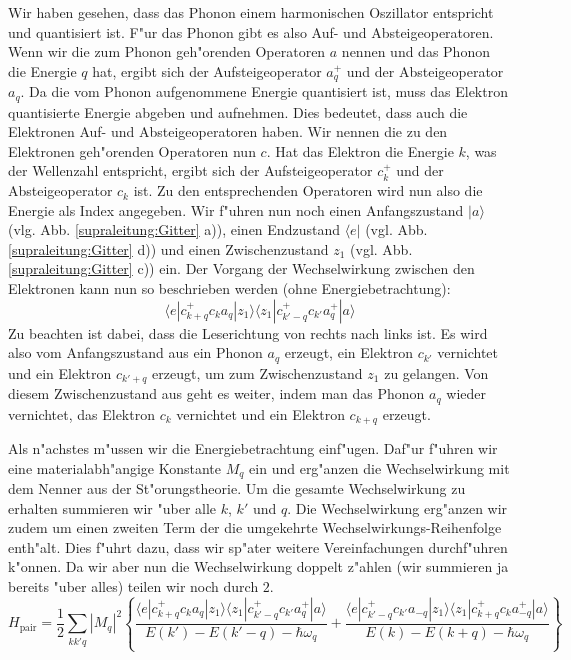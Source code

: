 \begin{refsection}
Wir haben gesehen, dass das Phonon einem harmonischen Oszillator entspricht und quantisiert ist.
F"ur das Phonon gibt es also Auf- und Absteigeoperatoren.
Wenn wir die zum Phonon geh"orenden Operatoren $a$ nennen und das Phonon die Energie $q$ hat,
ergibt sich der Aufsteigeoperator
$a^+_q$ und der Absteigeoperator $a_q$.
Da die vom Phonon aufgenommene Energie quantisiert ist, muss das Elektron quantisierte Energie
abgeben und aufnehmen.
Dies bedeutet, dass auch die Elektronen Auf- und Absteigeoperatoren haben.
Wir nennen die zu den Elektronen geh"orenden Operatoren nun $c$. Hat das Elektron die Energie $k$,
was der Wellenzahl entspricht, ergibt sich der Aufsteigeoperator $c^+_k$ und der
Absteigeoperator $c_k$ ist.
Zu den entsprechenden Operatoren wird nun also die Energie als Index angegeben.
Wir f"uhren nun noch einen Anfangszustand $|a\rangle$ (vlg. Abb. \ref{supraleitung:Gitter} a)),
einen Endzustand $\langle e|$ (vgl. Abb. \ref{supraleitung:Gitter} d)) und
einen Zwischenzustand $z_1$ (vgl. Abb. \ref{supraleitung:Gitter} c)) ein.
Der Vorgang der Wechselwirkung zwischen den Elektronen kann nun so beschrieben werden
(ohne Energiebetrachtung):
\begin{equation}
\langle e|c^+_{k+q} c_k a_q |z_1\rangle\langle z_1| c^+_{k'-q} c_{k'} a^+_q |a\rangle
\label{supraleitung:WechselwirkungOE}
\end{equation}
Zu beachten ist dabei, dass die Leserichtung von rechts nach links ist.
Es wird also vom Anfangszustand aus ein Phonon $a_q$ erzeugt, ein Elektron $c_{k'}$ vernichtet
und ein Elektron $c_{k'+q}$ erzeugt, um zum Zwischenzustand $z_1$ zu gelangen.
Von diesem Zwischenzustand aus geht es weiter, indem man das Phonon $a_q$ wieder vernichtet,
das Elektron $c_k$ vernichtet und ein Elektron $c_{k+q}$ erzeugt.

Als n"achstes m"ussen wir die Energiebetrachtung einf"ugen.
Daf"ur f"uhren wir eine materialabh"angige Konstante $M_q$ ein und erg"anzen die
Wechselwirkung mit dem Nenner aus der St"orungstheorie.
Um die gesamte Wechselwirkung zu erhalten summieren wir "uber alle $k$, $k'$ und $q$.
Die Wechselwirkung erg"anzen wir zudem um einen zweiten Term der die umgekehrte
Wechselwirkungs-Reihenfolge enth"alt.
Dies f"uhrt dazu, dass wir sp"ater weitere Vereinfachungen durchf"uhren k"onnen.
Da wir aber nun die Wechselwirkung doppelt z"ahlen (wir summieren ja bereits "uber alles)
teilen wir noch durch $2$.
\begin{equation}
H_{\text{pair}}=
\frac{1}{2}
\sum \limits_{kk'q} |M_q|^2
\left\{
\frac
{\langle e|c^+_{k+q} c_k a_q |z_1\rangle\langle z_1| c^+_{k'-q} c_{k'} a^+_q |a\rangle }
{E(k')-E(k'-q)-\hbar\omega_q}
+
\frac
{\langle e|c^+_{k'-q} c_{k'} a_{-q}|z_1\rangle\langle z_1| c^+_{k+q} c_k a^+_{-q} |a\rangle }
{E(k)-E(k+q)-\hbar\omega_q}
\right\}
\label{supraleitung:WechselwirkungME}
\end{equation}


\end{refsection}
